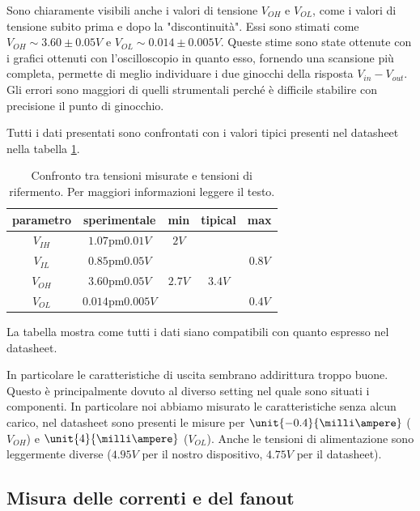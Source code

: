 \documentclass[a4paper,10pt]{article}
\begin{document}
Sono chiaramente visibili anche i valori di tensione $V_{OH}$ e $V_{OL}$, come i valori di tensione subito prima e dopo la "discontinuità". Essi sono stimati come $V_{OH}\sim 3.60 \pm 0.05 V$ e $V_{OL}\sim 0.014 \pm 0.005 V$. Queste stime sono state ottenute con i grafici ottenuti con l'oscilloscopio in quanto esso, fornendo una scansione più completa, permette di meglio individuare i due ginocchi della risposta $V_{in} - V_{out}$. Gli errori sono maggiori di quelli strumentali perché è difficile stabilire con precisione il punto di ginocchio. 

Tutti i dati presentati sono confrontati con i valori tipici presenti nel datasheet nella tabella \ref{Vresults}.

 \begin{table}[H]
	\centering
	\begin{tabular}{c|c|c|c|c}
		parametro & sperimentale & min & tipical & max\\		
		\hline
		$V_{IH}$ & $\unit{1.07 \pm 0.01}{V}$ & $\unit{2}{V}$&&\\
		$V_{IL}$ & $\unit{0.85 \pm 0.05}{V}$ &&& $\unit{0.8}{V}$ \\
		$V_{OH}$ & $\unit{3.60 \pm 0.05}{V}$ &$\unit{2.7}{V}$&$\unit{3.4}{V}$&\\
		$V_{OL}$ & $\unit{0.014 \pm 0.005}{V}$ &&&$\unit{0.4}{V}$ \\
		\hline
	\end{tabular}
	\caption{Confronto tra tensioni misurate e tensioni di rifermento. Per maggiori informazioni leggere il testo.}
	\label{Vresults}
\end{table}

\noindent La tabella mostra come tutti i dati siano compatibili con quanto espresso nel datasheet.

In particolare le caratteristiche di uscita sembrano addirittura troppo buone.
Questo è principalmente dovuto al diverso setting nel quale sono situati i componenti. In particolare noi abbiamo misurato le caratteristiche senza alcun carico, nel datasheet sono presenti le misure per $\unit{-0.4}{\milli\ampere}$ ($V_{OH}$) e $\unit{4}{\milli\ampere}$ ($V_{OL}$). Anche le tensioni di alimentazione sono leggermente diverse ($\unit{4.95}{V}$ per il nostro dispositivo, $\unit{4.75}{V}$ per il datasheet).


\subsection{Misura delle correnti e del fanout}
\end{document}
